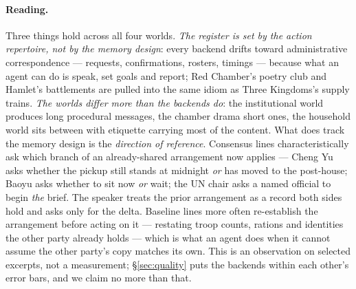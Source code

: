 

\paragraph{Reading.} Three things hold across all four worlds. \emph{The
register is set by the action repertoire, not by the memory design}: every
backend drifts toward administrative correspondence --- requests,
confirmations, rosters, timings --- because what an agent can do is speak, set
goals and report; Red Chamber's poetry club and Hamlet's battlements are
pulled into the same idiom as Three Kingdoms's supply trains. \emph{The worlds
differ more than the backends do}: the institutional world produces long
procedural messages, the chamber drama short ones, the household world sits
between with etiquette carrying most of the content. What does track the
memory design is the \emph{direction of reference}. Consensus lines
characteristically ask which branch of an already-shared arrangement now
applies --- Cheng Yu asks whether the pickup still stands at midnight
\emph{or} has moved to the post-house; Baoyu asks whether to sit now \emph{or}
wait; the UN chair asks a named official to begin \emph{the} brief. The
speaker treats the prior arrangement as a record both sides hold and asks only
for the delta. Baseline lines more often re-establish the arrangement before
acting on it --- restating troop counts, rations and identities the other
party already holds --- which is what an agent does when it cannot assume the
other party's copy matches its own. This is an observation on selected
excerpts, not a measurement; \S\ref{sec:quality} puts the backends within each
other's error bars, and we claim no more than that.
